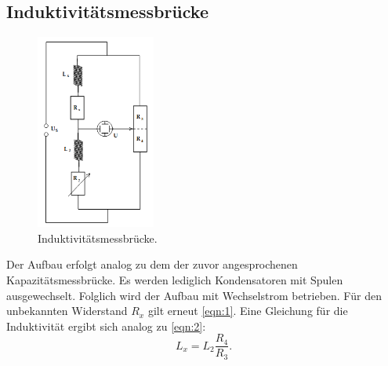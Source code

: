 \subsection{Induktivitätsmessbrücke}
\begin{figure}[H]
    \centering
        \centering
        \includegraphics[width=0.35\textwidth]{Bilder/induktivitaetsmess.png}
        \caption{Induktivitätsmessbrücke. \cite{anleitung}}
    \hfill
    \label{fig:f4}
\end{figure}
\noindent Der Aufbau erfolgt analog zu dem der zuvor angesprochenen 
Kapazitätsmessbrücke. Es werden lediglich Kondensatoren mit Spulen ausgewechselt.
Folglich wird der Aufbau mit Wechselstrom betrieben. Für den unbekannten
Widerstand $R_x$ gilt erneut \autoref{eqn:1}. Eine Gleichung für die Induktivität
ergibt sich analog zu \autoref{eqn:2}:
\begin{equation}
    \label{eqn:3}
    L_x = L_2 \frac{R_4}{R_3}.
\end{equation}

